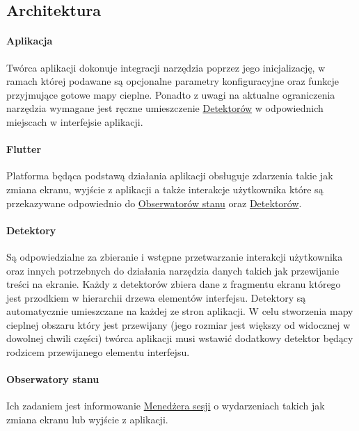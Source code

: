 \subsection{Architektura}

\paragraph{Aplikacja}
Twórca aplikacji dokonuje integracji narzędzia poprzez jego inicjalizację, w ramach której podawane są  opcjonalne parametry konfiguracyjne oraz funkcje przyjmujące gotowe mapy cieplne. Ponadto z uwagi na aktualne ograniczenia narzędzia wymagane jest ręczne umieszczenie \hyperref[par:rs_detectors]{Detektorów} w odpowiednich miejscach w interfejsie aplikacji.

\paragraph{Flutter} Platforma będąca podstawą działania aplikacji obsługuje zdarzenia takie jak zmiana ekranu, wyjście z aplikacji a także interakcje użytkownika które są przekazywane odpowiednio do \hyperref[par:rs_observers]{Obserwatorów stanu} oraz \hyperref[par:rs_detectors]{Detektorów}.

\paragraph{Detektory} 
\label{par:rs_detectors}
Są odpowiedzialne za zbieranie i wstępne przetwarzanie interakcji użytkownika oraz innych potrzebnych do działania narzędzia danych takich jak przewijanie treści na ekranie. Każdy z detektorów zbiera dane z fragmentu ekranu którego jest przodkiem w hierarchii drzewa elementów interfejsu. Detektory są automatycznie umieszczane na każdej ze stron aplikacji. W celu stworzenia mapy cieplnej obszaru który jest przewijany (jego rozmiar jest większy od widocznej w dowolnej chwili części) twórca aplikacji musi wstawić dodatkowy detektor będący rodzicem przewijanego elementu interfejsu.

\paragraph{Obserwatory stanu} 
\label{par:rs_observers}
Ich zadaniem jest informowanie \hyperref[par:rs_session_manager]{Menedżera sesji} o wydarzeniach takich jak zmiana ekranu lub wyjście z aplikacji.


